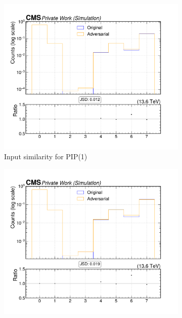 \begin{figure}[htbp]
  \centering
  \begin{subfigure}[t]{0.32\textwidth}
    \includegraphics[width=\linewidth]{media/output/features/compare/intprob_1/cmp_cpf_arr_Cpfcan_VTX_ass.pdf}
    \caption{Input similarity for PIP(1)}
  \end{subfigure}\hfill
  \begin{subfigure}[t]{0.32\textwidth}
    \includegraphics[width=\linewidth]{media/output/features/compare/intprob_2/cmp_cpf_arr_Cpfcan_VTX_ass.pdf}

\end{subfigure}
\end{figure}

